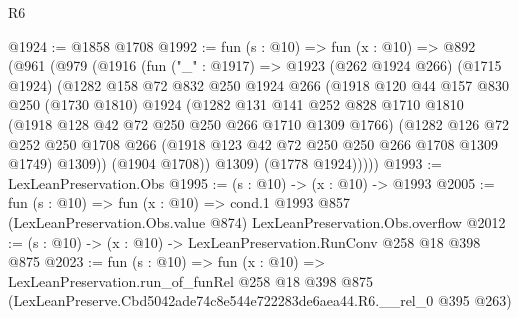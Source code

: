 \begin{lexlean}{R6}
\begin{coremodule}
@1924 := @1858 @1708
@1992 := fun (s : @10) =>
  fun (x : @10) =>
  @892
    (@961
      (@979
        (@1916
          (fun ("_" : @1917) =>
          @1923
            (@262 @1924 @266)
            (@1715 @1924)
            (@1282
              @158
              @72
              @832
              @250
              @1924
              @266
              (@1918
                @120
                @44
                @157
                @830
                @250
                (@1730 @1810)
                @1924
                (@1282
                  @131
                  @141
                  @252
                  @828
                  @1710
                  @1810
                  (@1918 @128 @42 @72 @250 @250 @266 @1710 @1309 @1766)
                  (@1282
                    @126
                    @72
                    @252
                    @250
                    @1708
                    @266
                    (@1918 @123 @42 @72 @250 @250 @266 @1708 @1309 @1749)
                    @1309))
                (@1904 @1708))
              @1309)
            (@1778 @1924)))))
@1993 := LexLeanPreservation.Obs
@1995 := (s : @10) -> (x : @10) -> @1993
@2005 := fun (s : @10) =>
  fun (x : @10) =>
  cond.{1} @1993 @857 (LexLeanPreservation.Obs.value @874) LexLeanPreservation.Obs.overflow
@2012 := (s : @10) -> (x : @10) -> LexLeanPreservation.RunConv @258 @18 @398 @875
@2023 := fun (s : @10) =>
  fun (x : @10) =>
  LexLeanPreservation.run_of_funRel
    @258
    @18
    @398
    @875
    (LexLeanPreserve.Cbd5042ade74c8e544e722283de6aea44.R6.__rel_0 @395 @263)
\end{coremodule}
\end{lexlean}
